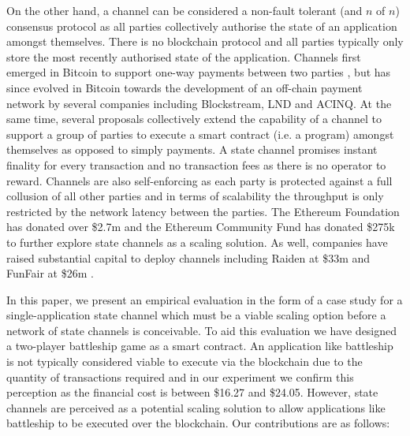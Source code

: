 \documentclass{llncs}
\begin{document}
On the other hand, a channel can be considered a non-fault tolerant (and $n$ of $n$) consensus protocol as all parties collectively authorise the state of an application amongst themselves. 
There is no blockchain protocol and all parties typically only store the most recently authorised state of the application. 
Channels first emerged in Bitcoin to support one-way payments between two parties \cite{spilman2013,decker2015fast}, but has since evolved in Bitcoin towards the development of an off-chain payment network \cite{poon2016bitcoin} by several companies including Blockstream, LND and ACINQ. 
At the same time, several proposals \cite{miller2017sprites,mccorry2018pisa,dziembowski2017perun,statechannelnetworks,coleman2018counterfactual} collectively extend the capability of a channel to support a group of parties to execute a smart contract (i.e. a program) amongst themselves as opposed to simply payments. 
A state channel promises instant finality for every transaction and no transaction fees as there is no operator to reward.
Channels are also self-enforcing as each party is protected against a full collusion of all other parties and in terms of scalability the throughput is only restricted by the network latency between the parties. 
The Ethereum Foundation has donated over \$2.7m \cite{efscaling1,efscaling2,efscaling3}  and the Ethereum Community Fund has donated \$275k \cite{ecfscaling} to further explore state channels as a scaling solution.
As well, companies have raised substantial capital to deploy channels including Raiden at \$33m \cite{raidenICO} and FunFair at \$26m \cite{funfair}.

In this paper, we present an empirical evaluation in the form of a case study for a single-application state channel which must be a viable scaling option before a network of state channels is conceivable. 
To aid this evaluation we have designed a two-player battleship game as a smart contract.
An application like battleship is not typically considered viable to execute via the blockchain due to the quantity of transactions required and in our experiment we confirm this perception as the financial cost is between \$16.27 and \$24.05. 
However, state channels are perceived as a potential scaling solution to allow applications like battleship to be executed over the blockchain. 
Our contributions are as follows: 
\end{document}
